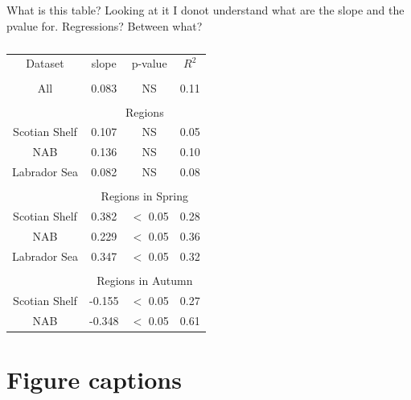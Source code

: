 \documentclass[utf8]{frontiersSCNS} %
\begin{document}
What is this table? Looking at it I donot understand what are the slope and the pvalue for. Regressions? Between what?

\begin{center}
\begin{table}
\begin{tabular}{c c c c}
Dataset & slope & p-value & $R^2$ \\
&&&\\
All & 0.083 & NS & 0.11 \\
&&&\\
 & \multicolumn{3}{c}{\large Regions} \\
Scotian Shelf &0.107 & NS & 0.05 \\
NAB & 0.136 & NS & 0.10 \\
Labrador Sea & 0.082 & NS & 0.08 \\
&&&\\
 & \multicolumn{3}{c}{\large Regions in Spring} \\
 Scotian Shelf & 0.382 &  $<$ 0.05 & 0.28 \\ 
 NAB & 0.229 &  $<$ 0.05 & 0.36 \\ 
Labrador Sea& 0.347 &  $<$ 0.05 & 0.32 \\ 
&&&\\
 & \multicolumn{3}{c}{\large Regions in Autumn} \\
 Scotian Shelf & -0.155 &  $<$ 0.05 & 0.27 \\ 
 NAB & -0.348 &  $<$ 0.05 & 0.61 \\ 
\end{tabular}
\caption{}
\label{tab:2}
\end{table}
\end{center}
\newpage
\section*{Figure captions}

\end{document}
